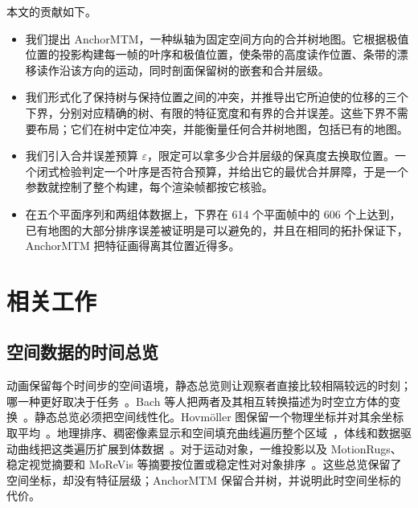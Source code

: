 \documentclass[preprint]{vgtc_zh}   %
\begin{document}
本文的贡献如下。
\begin{itemize}
\setlength{\itemsep}{2pt}
\setlength{\parsep}{0pt}
\item 我们提出 AnchorMTM，一种纵轴为固定空间方向的合并树地图。它根据极值位置的投影构建每一帧的叶序和极值位置，使条带的高度读作位置、条带的漂移读作沿该方向的运动，同时剖面保留树的嵌套和合并层级。
\item 我们形式化了保持树与保持位置之间的冲突，并推导出它所迫使的位移的三个下界，分别对应精确的树、有限的特征宽度和有界的合并误差。这些下界不需要布局；它们在树中定位冲突，并能衡量任何合并树地图，包括已有的地图。
\item 我们引入合并误差预算 $\varepsilon$，限定可以拿多少合并层级的保真度去换取位置。一个闭式检验判定一个叶序是否符合预算，并给出它的最优合并屏障，于是一个参数就控制了整个构建，每个渲染帧都按它核验。
\item 在五个平面序列和两组体数据上，下界在 614 个平面帧中的 606 个上达到，已有地图的大部分排序误差被证明是可以避免的，并且在相同的拓扑保证下，AnchorMTM 把特征画得离其位置近得多。
\end{itemize}

\section{相关工作}\label{sec:related}
\subsection{空间数据的时间总览}
动画保留每个时间步的空间语境，静态总览则让观察者直接比较相隔较远的时刻；哪一种更好取决于任务~\cite{Tversky:2002:Animation,Robertson:2008:Animation}。Bach 等人把两者及其相互转换描述为时空立方体的变换~\cite{Bach:2017:STC}。静态总览必须把空间线性化。Hovm\"oller 图保留一个物理坐标并对其余坐标取平均~\cite{Hovmoller:1949}。地理排序、稠密像素显示和空间填充曲线遍历整个区域~\cite{Guo:2006:SpatialOrder,Dafner:2000:CSFC,Rauscher:2025:1DO}，体线和数据驱动曲线把这类遍历扩展到体数据~\cite{Weissenboeck:2019:DVL,Zhou:2021:DSF}。对于运动对象，一维投影以及 MotionRugs、稳定视觉摘要和 MoReVis 等摘要按位置或稳定性对对象排序~\cite{Franke:2021:1DP,Buchmueller:2019:MR,Wulms:2021:SVS,Valdrighi:2024:MRV}。这些总览保留了空间坐标，却没有特征层级；AnchorMTM 保留合并树，并说明此时空间坐标的代价。
\end{document}
